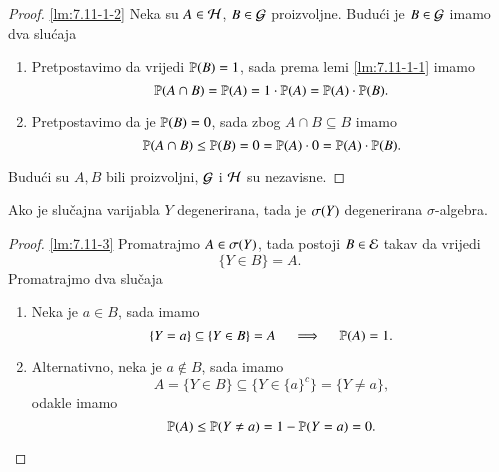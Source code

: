 \begin{rj}[\ref{zad:7.11}]
    \begin{proof}{\ref{lm:7.11-1-2}}
        Neka su $A \in \mathcal{H}$, $B \in \mathcal{G}$ proizvoljne.
        Budu\' ci je $B \in \mathcal{G}$ imamo dva slu\' caja
        \begin{enumerate}[label=($\arabic*^\circ$)]
            \item Pretpostavimo da vrijedi $\mathbb{P} (B) = 1$, sada prema lemi \ref{lm:7.11-1-1} imamo
            \begin{equation*}
                \mathbb{P} (A \cap B) = \mathbb{P} (A) = 1 \cdot \mathbb{P} (A) = \mathbb{P} (A) \cdot \mathbb{P} (B).
            \end{equation*}
            \item Pretpostavimo da je $\mathbb{P} (B) = 0$, sada zbog $A \cap B \subseteq B$ imamo
            \begin{equation*}
                \mathbb{P} (A \cap B) \leq \mathbb{P} (B) = 0 = \mathbb{P} (A) \cdot 0 = \mathbb{P} (A) \cdot \mathbb{P} (B).
            \end{equation*}
        \end{enumerate}
        Budu\' ci su $A, B$ bili proizvoljni, $\mathcal{G}$ i $\mathcal{H}$ su nezavisne.
    \end{proof}

    \begin{lm}  \label{lm:7.11-3}
        Ako je slu\v cajna varijabla $Y$ degenerirana, tada je $\sigma({Y})$ degenerirana $\sigma$-algebra.
    \end{lm}

    \begin{proof}{\ref{lm:7.11-3}}
        Promatrajmo $A \in \sigma({Y})$, tada postoji $B \in \mathcal{E}$ takav da vrijedi
        \begin{equation*}
            \{Y \in B\} = A.
        \end{equation*}
        Promatrajmo dva slu\v caja
        \begin{enumerate}[label=$(\arabic*^\circ)$]
            \item Neka je $a \in B$, sada imamo
            \begin{equation*}
                \{Y = a\} \subseteq \{Y \in B\} = A \quad \implies \quad \mathbb{P} (A) = 1.
            \end{equation*}
            \item Alternativno, neka je $a \notin B$, sada imamo
            \begin{equation*}
                A = \{ Y \in B\} \subseteq \big\{ Y \in \{a\}^c \big\} = \{ Y \neq a \},
            \end{equation*}
            odakle imamo
            \begin{equation*}
                \mathbb{P} (A) \leq \mathbb{P} (Y \neq a) = 1 - \mathbb{P} (Y = a) = 0.
            \end{equation*}
        \end{enumerate}
    \end{proof}
\end{rj}

